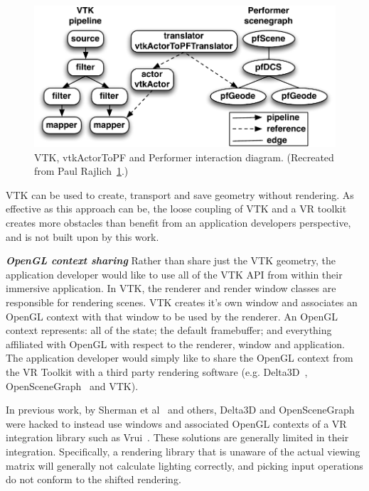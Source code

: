 \begin{figure}[h!]
 \centering
  \includegraphics[width=\linewidth]{images/vtkActorToPF.pdf}
  \caption{VTK, vtkActorToPF and Performer interaction diagram. (Recreated from Paul Rajlich~\ref{fig:vtkActorToPF}.)}
\label{fig:vtkActorToPF}
\end{figure}

VTK can be used to create, transport and save geometry without rendering. As effective as this approach can be, the loose coupling of VTK and a VR toolkit creates more obstacles than benefit from an application developers perspective, and is not built upon by this work.

\textbf{\textit{OpenGL context sharing}} Rather than share just the VTK geometry, the application developer would like to use all of the VTK API from within their immersive application.
In VTK, the renderer and render window classes are responsible for rendering scenes.
VTK creates it's own window and associates an OpenGL context with that window to be used by the renderer.
An OpenGL context represents: all of the state; the default framebuffer; and everything affiliated with OpenGL with respect to the renderer, window and application.
The application developer would simply like to share the OpenGL context from the VR Toolkit with a third party rendering software (e.g. Delta3D~\cite{McDowell:2006}, OpenSceneGraph~\cite{Wang:2010} and VTK). 

In previous work, by Sherman et al~\cite{Sherman:2010} and others, Delta3D
and OpenSceneGraph were hacked to instead use windows and associated
OpenGL contexts of a VR integration library such as Vrui~\cite{Kreylos:2006}.
These solutions are generally limited in their integration.
Specifically, a rendering library that is unaware of the actual
viewing matrix will generally not calculate lighting correctly, and
picking input operations do not conform to the shifted rendering.

